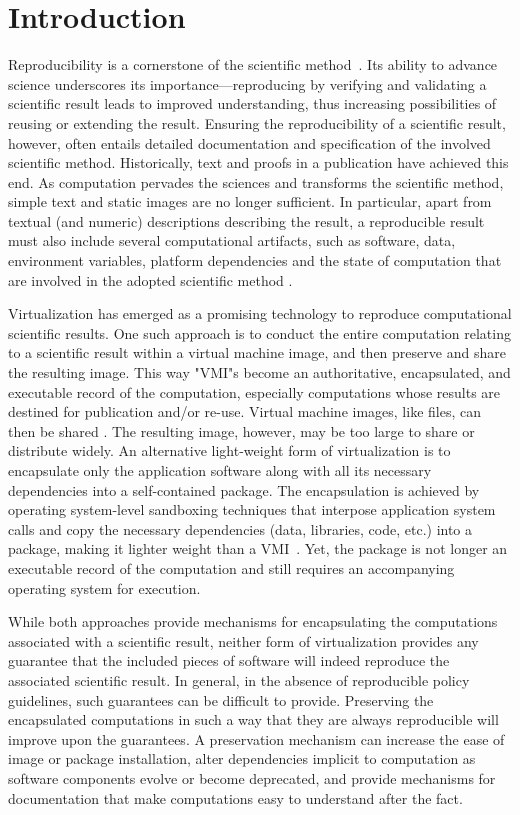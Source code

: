 \section{Introduction}

Reproducibility is a cornerstone of the scientific method~\cite{borgman2012data}. 
Its ability to advance science underscores its importance---reproducing by verifying and validating a scientific result leads to improved understanding, thus increasing possibilities of reusing or extending the result. 
Ensuring the reproducibility of a scientific result, however, often entails detailed documentation and specification of the involved scientific method. Historically, text and proofs in a publication have achieved this end. 
As computation pervades the sciences and transforms the scientific method, simple text and static images are no longer sufficient. 
In particular, apart from textual (and numeric) descriptions describing the result, a reproducible result must also include several computational artifacts, such as software, data, environment variables, platform dependencies and the state of computation that are involved in the adopted scientific method \cite{Sole}.  

Virtualization has emerged as a promising technology to reproduce computational scientific results.  One such approach is to conduct the entire computation relating to a scientific result within a virtual machine image, and then preserve and share the resulting image. This way "VMI"s become an authoritative, encapsulated, and executable record of the computation, especially computations whose results are destined for publication and/or re-use.  Virtual machine images, like files, can then be shared \cite{Lampoudi}. 
The resulting image, however, may be too large to share or distribute widely. An alternative light-weight form of virtualization is to encapsulate only the application software along with all its necessary dependencies into a self-contained package. The encapsulation is achieved by operating system-level sandboxing techniques that interpose application system calls and copy the necessary dependencies (data, libraries, code, etc.) into a package, making it lighter weight than a VMI~\cite{guo2011cde}. Yet, the package is not longer an executable record of the computation and still requires an accompanying operating system for execution. 

While both approaches provide mechanisms for encapsulating the computations associated with a scientific result, neither form of virtualization provides any guarantee that the included pieces of software will indeed reproduce the associated scientific result. In general, in the absence of reproducible policy guidelines, such guarantees can be difficult to provide. Preserving the encapsulated computations in such a way that they are always reproducible will improve upon the guarantees. A preservation mechanism can increase the ease of image or package installation, alter dependencies implicit to computation as software components evolve or become deprecated, and provide mechanisms for documentation that make computations easy to understand after the fact.

